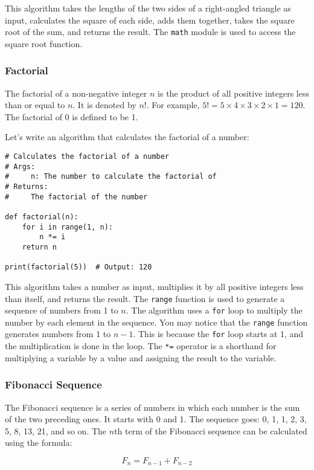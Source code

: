This algorithm takes the lengths of the two sides of a right-angled triangle as input, calculates the square of each side, adds them together, takes the square root of the sum, and returns the result. The \texttt{math} module is used to access the square root function.

\subsubsection{Factorial}

The factorial of a non-negative integer $n$ is the product of all positive integers less than or equal to $n$. It is denoted by $n!$. For example, $5! = 5 \times 4 \times 3 \times 2 \times 1 = 120$. The factorial of 0 is defined to be 1.

Let's write an algorithm that calculates the factorial of a number:

\begin{lstlisting}
# Calculates the factorial of a number
# Args:
#     n: The number to calculate the factorial of
# Returns:
#     The factorial of the number

def factorial(n):
    for i in range(1, n):
        n *= i
    return n

print(factorial(5))  # Output: 120
\end{lstlisting}

This algorithm takes a number as input, multiplies it by all positive integers less than itself, and returns the result. The \texttt{range} function is used to generate a sequence of numbers from 1 to $n$. The algorithm uses a \texttt{for} loop to multiply the number by each element in the sequence. You may notice that the \texttt{range} function generates numbers from 1 to $n-1$. This is because the \texttt{for} loop starts at 1, and the multiplication is done in the loop. The \texttt{*=} operator is a shorthand for multiplying a variable by a value and assigning the result to the variable.

\subsubsection{Fibonacci Sequence}

The Fibonacci sequence is a series of numbers in which each number is the sum of the two preceding ones. It starts with 0 and 1. The sequence goes: 0, 1, 1, 2, 3, 5, 8, 13, 21, and so on. The $n$th term of the Fibonacci sequence can be calculated using the formula:

\begin{equation}
    F_n = F_{n-1} + F_{n-2}
\end{equation}

